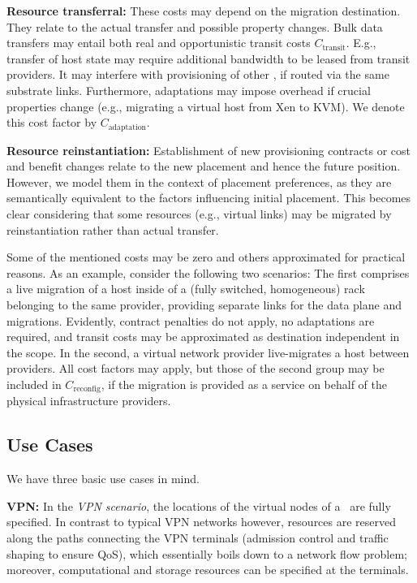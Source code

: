 \documentclass[conference,10pt]{IEEEtran}
\newcommand{\CloudNet}{\text{CloudNet}}
\newcommand{\CloudNets}{\text{CloudNets}}
\newcommand{\mrm}{\mathrm}
\begin{document}
\noindent \textbf{Resource transferral:} These costs may depend on the migration destination. They relate to the actual transfer and possible property changes.
		Bulk data transfers may entail both real and opportunistic transit costs $C_{\mrm{transit}}$.
		E.g., transfer of host state may require additional bandwidth to be leased from transit providers. It may interfere with provisioning of other \CloudNets, if routed via the same substrate links.
		Furthermore, adaptations may impose overhead if crucial properties change (e.g., migrating a virtual host from Xen to KVM). We denote this cost factor by $C_{\mrm{adaptation}}$.

\noindent \textbf{Resource reinstantiation:} Establishment of new provisioning contracts or cost and benefit changes relate to the new placement and hence the future position.
		However, we model them in the context of placement preferences, as they are semantically equivalent to the factors influencing initial placement.
		This becomes clear considering that some resources (e.g., virtual links) may be migrated by reinstantiation rather than actual transfer.

Some of the mentioned costs may be zero and others approximated for practical reasons. As an example, consider the following two scenarios:
The first comprises a live migration of a host inside of a (fully switched, homogeneous) rack belonging to the same provider, providing separate links for the data plane and migrations. Evidently, contract penalties do not apply, no adaptations are required, and transit costs may be approximated as destination independent in the scope.
In the second, a virtual network provider live-migrates a host between providers. All cost factors may apply, but those of the second group may be included in $C_{\mrm{reconfig}}$, if the migration is provided as a service on behalf of the physical infrastructure providers.

\subsection{Use Cases}

We have three basic use cases in mind.

\noindent \textbf{VPN:} In the \emph{VPN scenario}, the locations of the virtual nodes
of a \CloudNet\ are fully specified. In contrast to typical VPN
networks however, resources are reserved along the paths connecting
the VPN terminals (admission control and traffic shaping to ensure
QoS), which essentially boils down to a network flow problem;
moreover, computational and storage resources can be specified at
the terminals.
\end{document}
